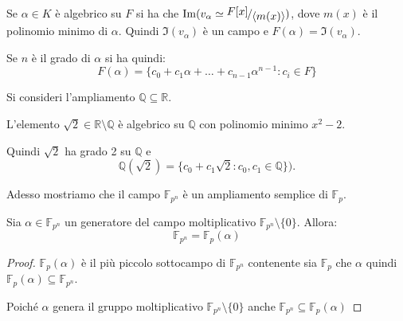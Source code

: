 \documentclass[../main.tex]{subfiles}
\begin{document}
Se $\alpha \in K$ è algebrico su $F$ si ha che $\Im(v_\alpha \simeq \nicefrac{F[x]}{\langle m(x)\rangle})$, dove $m(x)$ è il polinomio minimo di $\alpha$. Quindi $\Im(v_\alpha)$ è un campo e $F(\alpha) = \Im(v_\alpha)$.

Se $n$ è il grado di $\alpha$ si ha quindi:
\begin{equation*}
    F(\alpha) = \{c_0 + c_1\alpha + \ldots + c_{n-1}\alpha^{n-1} : c_i \in F\}
\end{equation*}

\begin{example}
    Si consideri l'ampliamento $\mathbb{Q} \subseteq \mathbb{R}$.

    L'elemento $\sqrt{2}\in \mathbb{R} \setminus \mathbb{Q}$ è algebrico su $\mathbb{Q}$ con polinomio minimo $x^2 -2$.

    Quindi $\sqrt{2}$ ha grado 2 su $\mathbb{Q}$ e
    \begin{equation*}
        \mathbb{Q}(\sqrt{2}) = \{ c_0 + c_1 \sqrt{2} : c_0,c_1 \in \mathbb{Q}\}).
    \end{equation*}
\end{example}

Adesso mostriamo che il campo $\mathbb{F}_{p^n}$ è un ampliamento semplice di $\mathbb{F}_p$.
\begin{proposition}
    Sia $\alpha \in \mathbb{F}_{p^n}$ un generatore del campo moltiplicativo $\mathbb{F}_{p^n} \setminus \{0\}$. Allora:
    \begin{equation*}
        \mathbb{F}_{p^n} = \mathbb{F}_p(\alpha)
    \end{equation*}
\end{proposition}

\begin{proof}
    $\mathbb{F}_p(\alpha)$ è il più piccolo sottocampo di $\mathbb{F}_{p^n}$ contenente sia $\mathbb{F}_p$ che $\alpha$ quindi $\mathbb{F}_p(\alpha) \subseteq \mathbb{F}_{p^n}$.

    Poiché $\alpha$ genera il gruppo moltiplicativo $\mathbb{F}_{p^n} \setminus \{0\}$ anche $\mathbb{F}_{p^n} \subseteq \mathbb{F}_p(\alpha)$
\end{proof}
\end{document}
